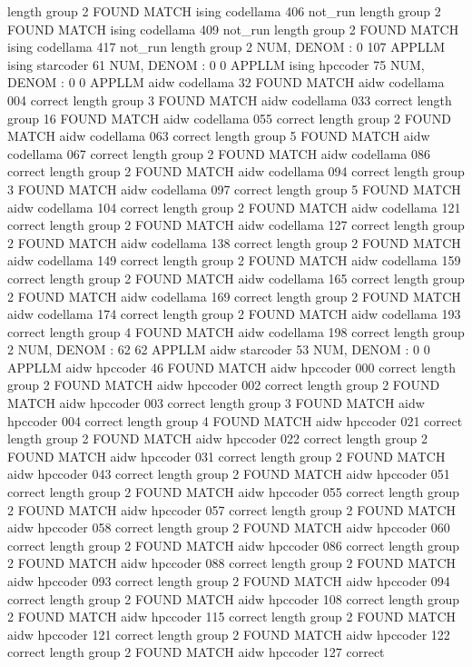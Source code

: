 length group  2
FOUND MATCH ising codellama 406 not_run
length group  2
FOUND MATCH ising codellama 409 not_run
length group  2
FOUND MATCH ising codellama 417 not_run
length group  2
NUM, DENOM : 0 107
APPLLM ising starcoder
61
NUM, DENOM : 0 0
APPLLM ising hpccoder
75
NUM, DENOM : 0 0
APPLLM aidw codellama
32
FOUND MATCH aidw codellama 004 correct
length group  3
FOUND MATCH aidw codellama 033 correct
length group  16
FOUND MATCH aidw codellama 055 correct
length group  2
FOUND MATCH aidw codellama 063 correct
length group  5
FOUND MATCH aidw codellama 067 correct
length group  2
FOUND MATCH aidw codellama 086 correct
length group  2
FOUND MATCH aidw codellama 094 correct
length group  3
FOUND MATCH aidw codellama 097 correct
length group  5
FOUND MATCH aidw codellama 104 correct
length group  2
FOUND MATCH aidw codellama 121 correct
length group  2
FOUND MATCH aidw codellama 127 correct
length group  2
FOUND MATCH aidw codellama 138 correct
length group  2
FOUND MATCH aidw codellama 149 correct
length group  2
FOUND MATCH aidw codellama 159 correct
length group  2
FOUND MATCH aidw codellama 165 correct
length group  2
FOUND MATCH aidw codellama 169 correct
length group  2
FOUND MATCH aidw codellama 174 correct
length group  2
FOUND MATCH aidw codellama 193 correct
length group  4
FOUND MATCH aidw codellama 198 correct
length group  2
NUM, DENOM : 62 62
APPLLM aidw starcoder
53
NUM, DENOM : 0 0
APPLLM aidw hpccoder
46
FOUND MATCH aidw hpccoder 000 correct
length group  2
FOUND MATCH aidw hpccoder 002 correct
length group  2
FOUND MATCH aidw hpccoder 003 correct
length group  3
FOUND MATCH aidw hpccoder 004 correct
length group  4
FOUND MATCH aidw hpccoder 021 correct
length group  2
FOUND MATCH aidw hpccoder 022 correct
length group  2
FOUND MATCH aidw hpccoder 031 correct
length group  2
FOUND MATCH aidw hpccoder 043 correct
length group  2
FOUND MATCH aidw hpccoder 051 correct
length group  2
FOUND MATCH aidw hpccoder 055 correct
length group  2
FOUND MATCH aidw hpccoder 057 correct
length group  2
FOUND MATCH aidw hpccoder 058 correct
length group  2
FOUND MATCH aidw hpccoder 060 correct
length group  2
FOUND MATCH aidw hpccoder 086 correct
length group  2
FOUND MATCH aidw hpccoder 088 correct
length group  2
FOUND MATCH aidw hpccoder 093 correct
length group  2
FOUND MATCH aidw hpccoder 094 correct
length group  2
FOUND MATCH aidw hpccoder 108 correct
length group  2
FOUND MATCH aidw hpccoder 115 correct
length group  2
FOUND MATCH aidw hpccoder 121 correct
length group  2
FOUND MATCH aidw hpccoder 122 correct
length group  2
FOUND MATCH aidw hpccoder 127 correct
